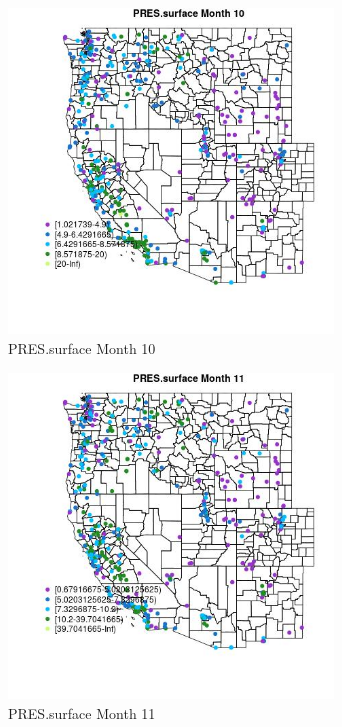 \clearpage 

\begin{figure} 
\centering  
\includegraphics[width=0.77\textwidth]{Code_Outputs/ML_input_report_ML_input_PM25_Step5_part_d_de_duplicated_aves_ML_input_MapObsMo10PRESsurface.jpg} 
\caption{\label{fig:ML_input_report_ML_input_PM25_Step5_part_d_de_duplicated_aves_ML_inputMapObsMo10PRESsurface}PRES.surface Month 10} 
\end{figure} 
 

\begin{figure} 
\centering  
\includegraphics[width=0.77\textwidth]{Code_Outputs/ML_input_report_ML_input_PM25_Step5_part_d_de_duplicated_aves_ML_input_MapObsMo11PRESsurface.jpg} 
\caption{\label{fig:ML_input_report_ML_input_PM25_Step5_part_d_de_duplicated_aves_ML_inputMapObsMo11PRESsurface}PRES.surface Month 11} 
\end{figure} 
 


